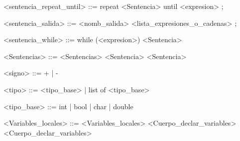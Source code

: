 \documentclass{scrartcl}
\begin{document}
\begin{grammar}
<sentencia_repeat_until> ::= repeat <Sentencia> until <expresion> ;

<sentencia_salida> ::= <nomb_salida> <lista_expresiones_o_cadenas> ;

<sentencia_while> ::= while (<expresion>) <Sentencia>

<Sentencias> ::= <Sentencias> <Sentencia>
\alt <Sentencia>

<signo> ::= + | -

<tipo> ::= <tipo_base> | list of <tipo_base>

<tipo_base> ::= int | bool | char | double

<Variables_locales> ::= <Variables_locales> <Cuerpo_declar_variables>
\alt <Cuerpo_declar_variables>

\end{grammar}
\end{document}
